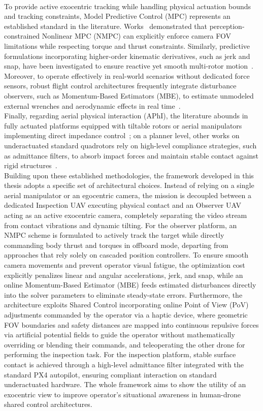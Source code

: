 \\To provide active exocentric tracking while handling physical actuation bounds and tracking constraints, Model Predictive Control (MPC) represents an established standard in the literature. Works~\cite{jacquet2021motor} demonstrated that perception-constrained Nonlinear MPC (NMPC) can explicitly enforce camera FOV limitations while respecting torque and thrust constraints. Similarly, predictive formulations incorporating higher-order kinematic derivatives, such as jerk and snap, have been investigated to ensure reactive yet smooth multi-rotor motion~\cite{mellinger2011minimum, shayan2025exponential}. Moreover, to operate effectively in real-world scenarios without dedicated force sensors, robust flight control architectures frequently integrate disturbance observers, such as Momentum-Based Estimators (MBE), to estimate unmodeled external wrenches and aerodynamic effects in real time~\cite{ruggiero2015passivity, tomic2014external}.
\\Finally, regarding aerial physical interaction (APhI), the literature abounds in fully actuated platforms equipped with tiltable rotors or aerial manipulators implementing direct impedance control~\cite{dangelo2025semi_platform}; on a planner level, other works on underactuated standard quadrotors rely on high-level compliance strategies, such as admittance filters, to absorb impact forces and maintain stable contact against rigid structures~\cite{Alharbat2025pred_admittance, Augugliaro2013adm_human_quad_interaction}.
\\Building upon these established methodologies, the framework developed in this thesis adopts a specific set of architectural choices. Instead of relying on a single aerial manipulator or an egocentric camera, the mission is decoupled between a dedicated Inspection UAV executing physical contact and an Observer UAV acting as an active exocentric camera, completely separating the video stream from contact vibrations and dynamic tilting. For the observer platform, an NMPC scheme is formulated to actively track the target while directly commanding body thrust and torques in offboard mode, departing from approaches that rely solely on cascaded position controllers. To ensure smooth camera movements and prevent operator visual fatigue, the optimization cost explicitly penalizes linear and angular accelerations, jerk, and snap, while an online Momentum-Based Estimator (MBE) feeds estimated disturbances directly into the solver parameters to eliminate steady-state errors. Furthermore, the architecture exploits Shared Control incorporating online Point of View (PoV) adjustments commanded by the operator via a haptic device, where geometric FOV boundaries and safety distances are mapped into continuous repulsive forces via artificial potential fields to guide the operator without mathematically overriding or blending their commands, and teleoperating the other drone for performing the inspection task. For the inspection platform, stable surface contact is achieved through a high-level admittance filter integrated with the standard PX4 autopilot, ensuring compliant interaction on standard underactuated hardware. The whole framework aims to show the utility of an exocentric view to improve operator's situational awareness in human-drone shared control architectures. 